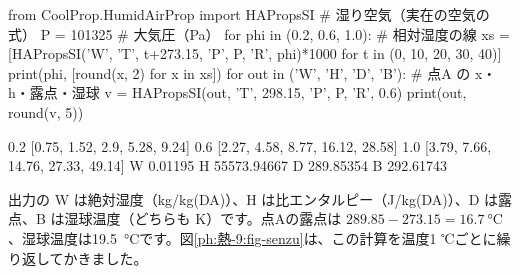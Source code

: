 \begin{bkfigure}
\label{ph:熱-9:fig-senzu}
\end{bkfigure}

\begin{phcode}[Python]
from CoolProp.HumidAirProp import HAPropsSI   \# 湿り空気（実在の空気の式）
P = 101325                                     \# 大気圧（Pa）
for phi in (0.2, 0.6, 1.0):                    \# 相対湿度の線
    xs = [HAPropsSI('W', 'T', t+273.15, 'P', P, 'R', phi)*1000
          for t in (0, 10, 20, 30, 40)]
    print(phi, [round(x, 2) for x in xs])
for out in ('W', 'H', 'D', 'B'):  \# 点A の x・h・露点・湿球
    v = HAPropsSI(out, 'T', 298.15, 'P', P, 'R', 0.6)
    print(out, round(v, 5))
\end{phcode}
\begin{phcodeout}
0.2 [0.75, 1.52, 2.9, 5.28, 9.24]
0.6 [2.27, 4.58, 8.77, 16.12, 28.58]
1.0 [3.79, 7.66, 14.76, 27.33, 49.14]
W 0.01195
H 55573.94667
D 289.85354
B 292.61743
\end{phcodeout}
\noindent 出力の W は絶対湿度（kg/kg(DA)）、H は比エンタルピー（J/kg(DA)）、D は露点、B は湿球温度（どちらも K）です。点Aの露点は $289.85-273.15=\qty{16.7}{\celsius}$、湿球温度は\qty{19.5}{\celsius}です。図\ref{ph:熱-9:fig-senzu}は、この計算を温度1 ℃ごとに繰り返してかきました。


